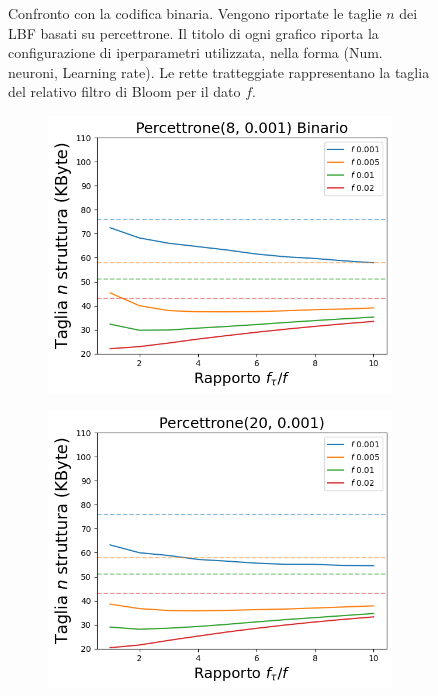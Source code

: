 \documentclass[../../main.tex]{subfiles}
\begin{document}
\begin{figure}[H]
\begin{subfigure}[b]{0.48\textwidth}
            \caption{}
        \end{subfigure}
        \caption{Confronto con la codifica binaria. Vengono riportate le taglie $n$ dei LBF basati su percettrone. Il titolo di ogni grafico riporta la configurazione di iperparametri utilizzata, nella forma (Num. neuroni, Learning rate). Le rette tratteggiate rappresentano la taglia del relativo filtro di Bloom per il dato $f$.}
        \label{fig:tagliePercettroniBinLBF}
    \end{figure}

    \begin{figure}[H]
        \centering
        \begin{subfigure}[b]{0.48\textwidth}
            \centering
            \includegraphics[width=\textwidth]{immagini/7/SLBF/Percettrone(8, 0.001) Binario_Taglia.png}
            \caption{}
        \end{subfigure}
        \begin{subfigure}[b]{0.48\textwidth}
            \centering
            \includegraphics[width=\textwidth]{immagini/7/SLBF/Percettrone(20, 0.001)_Taglia.png}

\end{subfigure}
\end{figure}
\end{document}
